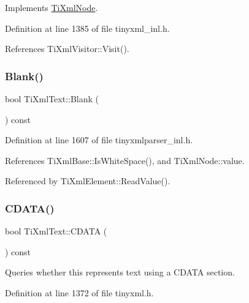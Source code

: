 Implements \hyperlink{class_ti_xml_node_acc0f88b7462c6cb73809d410a4f5bb86}{Ti\+Xml\+Node}.



Definition at line 1385 of file tinyxml\+\_\+inl.\+h.



References Ti\+Xml\+Visitor\+::\+Visit().

\hypertarget{class_ti_xml_text_a0fd9005b279def46859b72f336b158da}{}\label{class_ti_xml_text_a0fd9005b279def46859b72f336b158da} 
\subsubsection{\texorpdfstring{Blank()}{Blank()}}
{\footnotesize\ttfamily bool Ti\+Xml\+Text\+::\+Blank (\begin{DoxyParamCaption}{ }\end{DoxyParamCaption}) const\hspace{0.3cm}{\ttfamily [protected]}}



Definition at line 1607 of file tinyxmlparser\+\_\+inl.\+h.



References Ti\+Xml\+Base\+::\+Is\+White\+Space(), and Ti\+Xml\+Node\+::value.



Referenced by Ti\+Xml\+Element\+::\+Read\+Value().

\hypertarget{class_ti_xml_text_aac1f4764d220ed6bf809b16dfcb6b45a}{}\label{class_ti_xml_text_aac1f4764d220ed6bf809b16dfcb6b45a} 
\subsubsection{\texorpdfstring{C\+D\+A\+T\+A()}{CDATA()}}
{\footnotesize\ttfamily bool Ti\+Xml\+Text\+::\+C\+D\+A\+TA (\begin{DoxyParamCaption}{ }\end{DoxyParamCaption}) const\hspace{0.3cm}{\ttfamily [inline]}}



Queries whether this represents text using a C\+D\+A\+TA section. 



Definition at line 1372 of file tinyxml.\+h.



